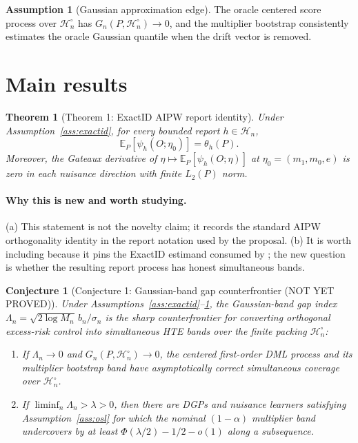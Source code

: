 \documentclass[11pt]{article}
\newcommand{\E}{\mathbb{E}}
\newcommand{\calH}{\mathcal{H}}
\theoremstyle{definition}
\newtheorem{assumption}{Assumption}
\theoremstyle{plain}
\newtheorem{theorem}{Theorem}
\newtheorem{conjecture}{Conjecture}
\theoremstyle{remark}
\begin{document}
\begin{assumption}[Gaussian approximation edge]\label{ass:gaussianedge}
The oracle centered score process over \(\calH_n^\circ\) has
\(G_n(P,\calH_n^\circ)\to0\), and the multiplier bootstrap consistently
estimates the oracle Gaussian quantile when the drift vector is removed.
\end{assumption}

\section{Main results}
\begin{theorem}[Theorem 1: ExactID AIPW report identity]\label{thm:id}
Under Assumption~\ref{ass:exactid}, for every bounded report
\(h\in\calH_n\),
\[
\E_P[\psi_h(O;\eta_0)]=\theta_h(P).
\]
Moreover, the Gateaux derivative of
\(\eta\mapsto \E_P[\psi_h(O;\eta)]\) at \(\eta_0=(m_1,m_0,e)\) is zero in each
nuisance direction with finite \(L_2(P)\) norm.
\end{theorem}

\paragraph{Why this is new and worth studying.}
(a) This statement is not the novelty claim; it records the standard
\citet{ChernozhukovEtAl2018DML} AIPW orthogonality identity in the report
notation used by the proposal.  (b) It is worth including because it pins the
ExactID estimand consumed by \citet{SemenovaChernozhukov2021DMLCATE}; the new
question is whether the resulting report process has honest simultaneous
bands.

\begin{conjecture}[Conjecture 1: Gaussian-band gap counterfrontier (NOT YET PROVED)]\label{conj:gap-counterfrontier}
Under Assumptions~\ref{ass:exactid}--\ref{ass:gaussianedge}, the Gaussian-band
gap index \(\Lambda_n=\sqrt{2\log M_n}\,b_n/\sigma_n\) is the sharp
counterfrontier for converting orthogonal excess-risk control into
simultaneous HTE bands over the finite packing \(\calH_n^\circ\):
\begin{enumerate}[label=(\roman*)]
\item If \(\Lambda_n\to0\) and \(G_n(P,\calH_n^\circ)\to0\), the centered
first-order DML process and its multiplier bootstrap band have asymptotically
correct simultaneous coverage over \(\calH_n^\circ\).
\item If \(\liminf_n \Lambda_n>\lambda>0\), then there are DGPs and nuisance
learners satisfying Assumption~\ref{ass:osl} for which the nominal
\((1-\alpha)\) multiplier band undercovers by at least
\(\Phi(\lambda/2)-1/2-o(1)\) along a subsequence.
\end{enumerate}
\end{conjecture}
\end{document}
